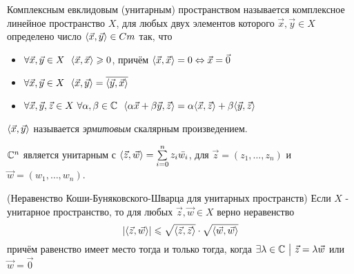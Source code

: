 \begin{definition}
	Комплексным евклидовым (унитарным) пространством называется комплексное линейное пространство $X$, для любых двух элементов которого $\vec{x}, \vec{y} \in X$ определено число $\langle\vec{x}, \vec{y}\rangle \in Cm$ так, что
	\begin{itemize}
		\item $\forall \vec{x}, \vec{y} \in X\ \ \trbr{\vec{x}, \vec{x}} \ge 0$, причём $\langle\vec{x}, \vec{x}\rangle = 0 \Leftrightarrow \vec{x} = \vec{0}$
		
		\item $\forall \vec{x}, \vec{y} \in X\ \ \trbr{\vec{x}, \vec{y}} = \overline{\trbr{\vec{y}, \vec{x}}}$
		
		\item $\forall \vec{x}, \vec{y}, \vec{z} \in X\ \forall \alpha, \beta \in \mathbb{C}\ \ \langle\alpha\vec{x} + \beta\vec{y}, \vec{z}\rangle = \alpha\langle\vec{x}, \vec{z}\rangle + \beta\langle\vec{y}, \vec{z}\rangle$
	\end{itemize}
	$\langle\vec{x}, \vec{y}\rangle$ называется \textit{эрмитовым} скалярным произведением.
\end{definition}

\begin{lemma}
	$\mathbb{C}^n$ является унитарным с $\langle\vec{z}, \vec{w}\rangle = \sum\limits_{i = 0}^n z_i \bar{w_i}$, для $\vec{z} = (z_1, \ldots, z_n)$ и $\vec{w} = (w_1, \ldots, w_n)$.
\end{lemma}

\begin{theorem} (Неравенство Коши-Буняковского-Шварца для унитарных пространств)
	Если $X$ - унитарное пространство, то для любых $\vec{z}, \vec{w} \in X$ верно неравенство
	\[
		|\langle\vec{z}, \vec{w}\rangle| \leqslant \sqrt{\langle\vec{z}, \vec{z}\rangle} \cdot \sqrt{\langle\vec{w}, \vec{w}\rangle}
	\]
	причём равенство имеет место тогда и только тогда, когда $\exists \lambda \in \mathbb{C} \ \big|\  \vec{z} = \lambda\vec{w}$ или $\vec{w} = \vec{0}$
\end{theorem}


